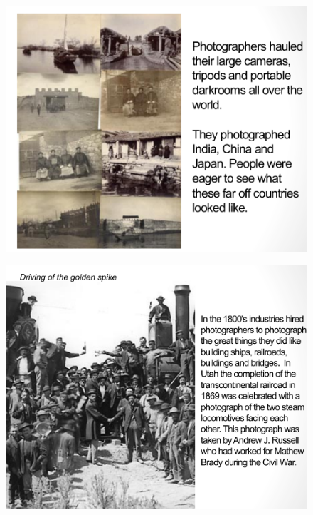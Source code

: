 \documentclass{beamer}
\begin{document}
\begin{frame}
	\begin{figure}
		\centering
		\includegraphics[scale=0.4]{95.jpg}
	\end{figure}
\end{frame}

\begin{frame}
	\begin{figure}
		\centering
		\includegraphics[scale=0.4]{96.jpg}
	\end{figure}
\end{frame}
\end{document}
